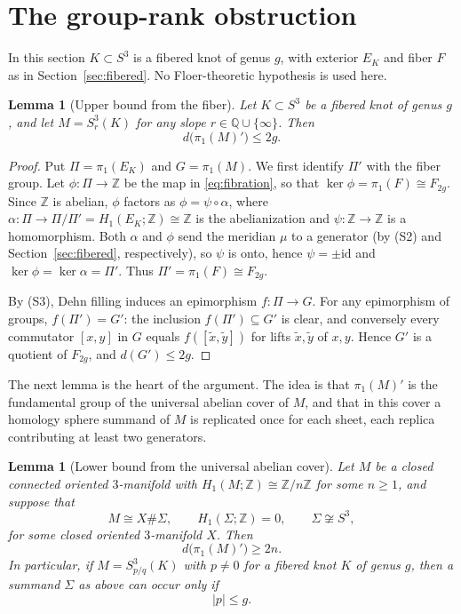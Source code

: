 \documentclass[11pt]{article}
\newcommand{\Z}{\mathbb Z}
\newcommand{\Q}{\mathbb Q}
\newcommand{\Surg}[2]{S^3_{#1}(#2)}
\newcommand{\rk}{d}
\newtheorem{lemma}[theorem]{Lemma}
\theoremstyle{definition}
\theoremstyle{remark}
\begin{document}
\section{The group-rank obstruction}\label{sec:rank}

In this section \(K\subset S^3\) is a fibered knot of genus \(g\), with
exterior \(E_K\) and fiber \(F\) as in Section~\ref{sec:fibered}. No
Floer-theoretic hypothesis is used here.

\begin{lemma}[Upper bound from the fiber]\label{lem:fiber}
Let \(K\subset S^3\) be a fibered knot of genus \(g\), and let
\(M=\Surg{r}{K}\) for any slope \(r\in\Q\cup\{\infty\}\). Then
\[
 \rk\bigl(\pi_1(M)'\bigr)\leq 2g.
\]
\end{lemma}

\begin{proof}
Put \(\Pi=\pi_1(E_K)\) and \(G=\pi_1(M)\). We first identify \(\Pi'\)
with the fiber group. Let \(\phi\colon\Pi\to\Z\) be the map in
\eqref{eq:fibration}, so that \(\ker\phi=\pi_1(F)\cong F_{2g}\). Since
\(\Z\) is abelian, \(\phi\) factors as \(\phi=\psi\circ\alpha\), where
\(\alpha\colon\Pi\to\Pi/\Pi'=H_1(E_K;\Z)\cong\Z\) is the abelianization
and \(\psi\colon\Z\to\Z\) is a homomorphism. Both \(\alpha\) and
\(\phi\) send the meridian \(\mu\) to a generator (by (S2) and
Section~\ref{sec:fibered}, respectively), so \(\psi\) is onto, hence
\(\psi=\pm\mathrm{id}\) and \(\ker\phi=\ker\alpha=\Pi'\). Thus
\(\Pi'=\pi_1(F)\cong F_{2g}\).

By (S3), Dehn filling induces an epimorphism \(f\colon\Pi\to G\). For
any epimorphism of groups, \(f(\Pi')=G'\): the inclusion
\(f(\Pi')\subseteq G'\) is clear, and conversely every commutator
\([x,y]\) in \(G\) equals \(f([\tilde x,\tilde y])\) for lifts
\(\tilde x,\tilde y\) of \(x,y\). Hence \(G'\) is a quotient of
\(F_{2g}\), and \(\rk(G')\leq2g\).
\end{proof}

The next lemma is the heart of the argument. The idea is that
\(\pi_1(M)'\) is the fundamental group of the universal abelian cover of
\(M\), and that in this cover a homology sphere summand of \(M\) is
replicated once for each sheet, each replica contributing at least two
generators.

\begin{lemma}[Lower bound from the universal abelian cover]\label{lem:cover}
Let \(M\) be a closed connected oriented \(3\)-manifold with
\(H_1(M;\Z)\cong\Z/n\Z\) for some \(n\geq1\), and suppose that
\[
 M\cong X\#\Sigma,
 \qquad H_1(\Sigma;\Z)=0,\qquad \Sigma\not\cong S^3,
\]
for some closed oriented \(3\)-manifold \(X\). Then
\[
 \rk\bigl(\pi_1(M)'\bigr)\geq 2n.
\]
In particular, if \(M=\Surg{p/q}{K}\) with \(p\neq0\) for a fibered knot
\(K\) of genus \(g\), then a summand \(\Sigma\) as above can occur only if
\begin{equation}\label{eq:numerator}
 |p|\leq g.
\end{equation}
\end{lemma}
\end{document}
